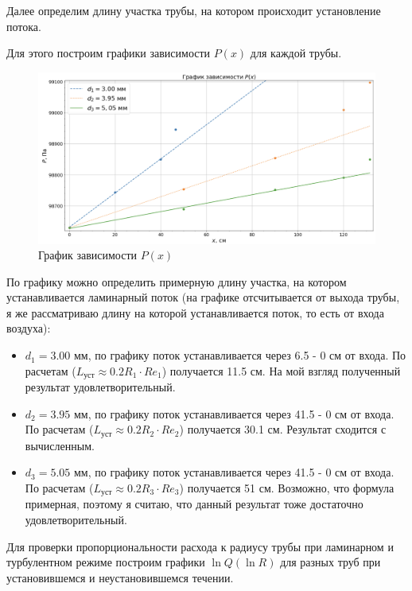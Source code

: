 \documentclass[a4paper,12pt]{article}
\theoremstyle{definition}
\begin{document}
	Далее определим длину участка трубы, на котором происходит установление потока.
	
	Для этого построим графики зависимости $P(x)$ для каждой трубы.
	
	\begin{figure}[H]
		\centering
		\includegraphics[scale = 0.55]{px}
		\caption{График зависимости $P(x)$}
		\label{graph4}
	\end{figure}

	По графику можно определить примерную длину участка, на котором устанавливается ламинарный поток (на графике отсчитывается от выхода трубы, я же рассматриваю длину на которой устанавливается поток, то есть от входа воздуха):
	\begin{itemize}
		\item $d_1 = 3.00$ мм, по графику поток устанавливается через 6.5 - 0 см от входа. По расчетам ($L_\text{уст} \approx 0.2R_1\cdot Re_1$)  получается 11.5 см. На мой взгляд полученный результат удовлетворительный.
		\item $d_2 = 3.95$ мм, по графику поток устанавливается через 41.5 - 0 см от входа. По расчетам ($L_\text{уст} \approx 0.2R_2\cdot Re_2$)  получается 30.1 см. Результат сходится с вычисленным.
		\item $d_3 = 5.05$ мм, по графику поток устанавливается через 41.5 - 0 см от входа. По расчетам ($L_\text{уст} \approx 0.2R_3\cdot Re_3$)  получается 51 см. Возможно, что формула примерная, поэтому я считаю, что данный результат тоже достаточно удовлетворительный.
	\end{itemize}

	Для проверки пропорциональности расхода к радиусу трубы при ламинарном и турбулентном режиме построим графики $\ln Q(\ln R)$ для разных труб при установившемся и неустановившемся течении.
	
\end{document}
